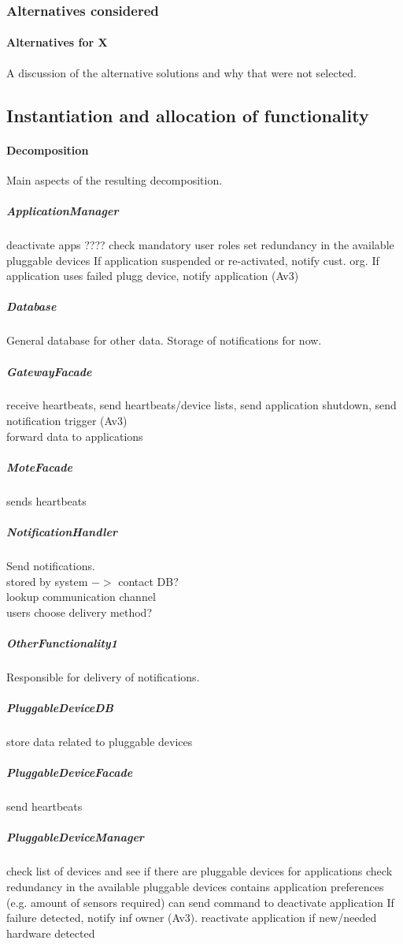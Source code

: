 \subsubsection{Alternatives considered}
    \paragraph{Alternatives for X}
    A discussion of the alternative solutions and why that were not selected.


\subsection{Instantiation and allocation of functionality}
    \paragraph{Decomposition}
    Main aspects of the resulting decomposition.

    \subparagraph{ApplicationManager}
    deactivate apps
    ???? check mandatory user roles
    set redundancy in the available pluggable devices
    If application suspended or re-activated, notify cust. org.
    If application uses failed plugg device, notify application
    (Av3)

    \subparagraph{Database}
    General database for other data. Storage of notifications for now.

    \subparagraph{GatewayFacade}
    receive heartbeats, send heartbeats/device lists, send application shutdown, send notification trigger (Av3)\\
    forward data to applications

    \subparagraph{MoteFacade}
    sends heartbeats

    \subparagraph{NotificationHandler}
    Send notifications. \\
    stored by system \(->\) contact DB? \\
    lookup communication channel \\
    users choose delivery method?

    \subparagraph{OtherFunctionality1}
    Responsible for delivery of notifications.

    \subparagraph{PluggableDeviceDB}
    store data related to pluggable devices

    \subparagraph{PluggableDeviceFacade}
    send heartbeats

    \subparagraph{PluggableDeviceManager}
    check list of devices and see if there are pluggable devices for applications
    check redundancy in the available pluggable devices
    contains application preferences (e.g. amount of sensors required)
    can send command to deactivate application
    If failure detected, notify inf owner (Av3).
    reactivate application if new/needed hardware detected

